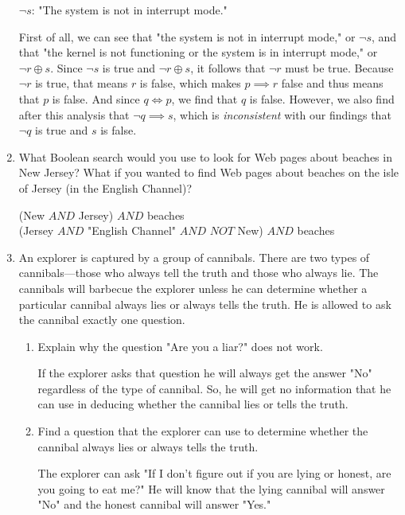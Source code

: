 \documentclass[11pt]{article}
\begin{document}
\begin{enumerate}[label=\textbf{\arabic*.}]
	\hspace{1em}$\neg s$: "The system is not in interrupt mode."
	
	First of all, we can see that "the system is not in interrupt mode," or $\neg s$, and that "the kernel is not functioning or the system is in interrupt mode," or $\neg r \oplus s$. Since $\neg s$ is true and $\neg r \oplus s$, it follows that $\neg r$ must be true. Because $\neg r$ is true, that means $r$ is false, which makes $p \implies r$ false and thus means that $p$ is false. And since $q \iff p$, we find that $q$ is false. However, we also find after this analysis that $\neg q \implies s$, which is \emph{inconsistent} with our findings that $\neg q$ is true and $s$ is false.
	
	\item What Boolean search would you use to look for Web pages about beaches in New Jersey? What if you wanted to find Web pages about beaches on the isle of Jersey (in the English Channel)?
	
	(New $AND$ Jersey) $AND$ beaches \\
	(Jersey $AND$ "English Channel" $AND$ $NOT$ New) $AND$ beaches
	
	\item An explorer is captured by a group of cannibals. There are two types of cannibals---those who always tell the truth and those who always lie. The cannibals will barbecue the explorer unless he can determine whether a particular cannibal always lies or always tells the truth. He is allowed to ask the cannibal exactly one question.
	\begin{enumerate}[label=\textbf{\alph*)}]
		\item Explain why the question "Are you a liar?" does not work.
		
		If the explorer asks that question he will always get the answer "No" regardless of the type of cannibal. So, he will get no information that he can use in deducing whether the cannibal lies or tells the truth.
		
		\item Find a question that the explorer can use to determine whether the cannibal always lies or always tells the truth.
		
		The explorer can ask "If I don't figure out if you are lying or honest, are you going to eat me?" He will know that the lying cannibal will answer "No" and the honest cannibal will answer "Yes."
	\end{enumerate}
	

\end{enumerate}
\end{document}

